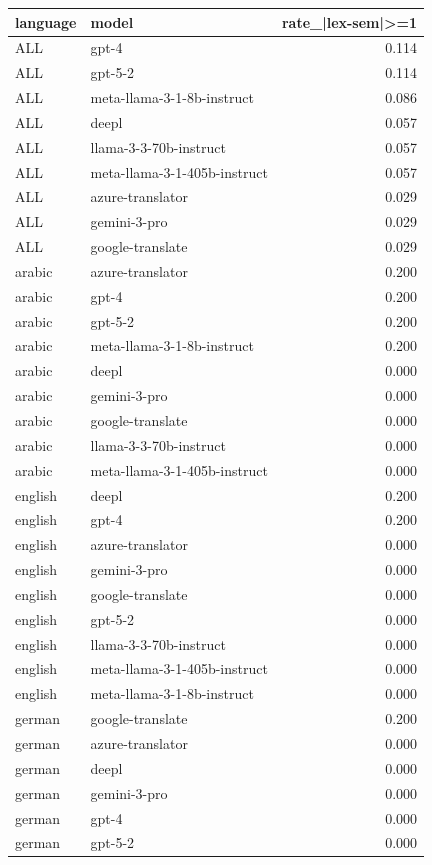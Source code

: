 \begin{tabular}{llr}
\toprule
language & model & rate\_|lex-sem|>=1 \\
\midrule
ALL & gpt-4 & 0.114 \\
ALL & gpt-5-2 & 0.114 \\
ALL & meta-llama-3-1-8b-instruct & 0.086 \\
ALL & deepl & 0.057 \\
ALL & llama-3-3-70b-instruct & 0.057 \\
ALL & meta-llama-3-1-405b-instruct & 0.057 \\
ALL & azure-translator & 0.029 \\
ALL & gemini-3-pro & 0.029 \\
ALL & google-translate & 0.029 \\
arabic & azure-translator & 0.200 \\
arabic & gpt-4 & 0.200 \\
arabic & gpt-5-2 & 0.200 \\
arabic & meta-llama-3-1-8b-instruct & 0.200 \\
arabic & deepl & 0.000 \\
arabic & gemini-3-pro & 0.000 \\
arabic & google-translate & 0.000 \\
arabic & llama-3-3-70b-instruct & 0.000 \\
arabic & meta-llama-3-1-405b-instruct & 0.000 \\
english & deepl & 0.200 \\
english & gpt-4 & 0.200 \\
english & azure-translator & 0.000 \\
english & gemini-3-pro & 0.000 \\
english & google-translate & 0.000 \\
english & gpt-5-2 & 0.000 \\
english & llama-3-3-70b-instruct & 0.000 \\
english & meta-llama-3-1-405b-instruct & 0.000 \\
english & meta-llama-3-1-8b-instruct & 0.000 \\
german & google-translate & 0.200 \\
german & azure-translator & 0.000 \\
german & deepl & 0.000 \\
german & gemini-3-pro & 0.000 \\
german & gpt-4 & 0.000 \\
german & gpt-5-2 & 0.000 \\

\end{tabular}
